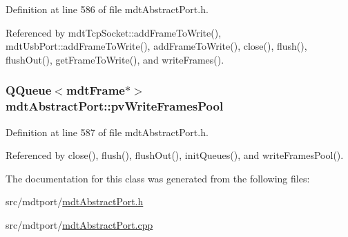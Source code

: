 Definition at line 586 of file mdt\-Abstract\-Port.\-h.



Referenced by mdt\-Tcp\-Socket\-::add\-Frame\-To\-Write(), mdt\-Usb\-Port\-::add\-Frame\-To\-Write(), add\-Frame\-To\-Write(), close(), flush(), flush\-Out(), get\-Frame\-To\-Write(), and write\-Frames().

\hypertarget{classmdt_abstract_port_a67a8b1965f20a55ad115926aed0234b4}{
\subsubsection[{pv\-Write\-Frames\-Pool}]{\setlength{\rightskip}{0pt plus 5cm}Q\-Queue$<${\bf mdt\-Frame}$\ast$$>$ mdt\-Abstract\-Port\-::pv\-Write\-Frames\-Pool\hspace{0.3cm}{\ttfamily [protected]}}}\label{classmdt_abstract_port_a67a8b1965f20a55ad115926aed0234b4}


Definition at line 587 of file mdt\-Abstract\-Port.\-h.



Referenced by close(), flush(), flush\-Out(), init\-Queues(), and write\-Frames\-Pool().



The documentation for this class was generated from the following files\-:\begin{DoxyCompactItemize}
\item 
src/mdtport/\hyperlink{mdt_abstract_port_8h}{mdt\-Abstract\-Port.\-h}\item 
src/mdtport/\hyperlink{mdt_abstract_port_8cpp}{mdt\-Abstract\-Port.\-cpp}\end{DoxyCompactItemize}
